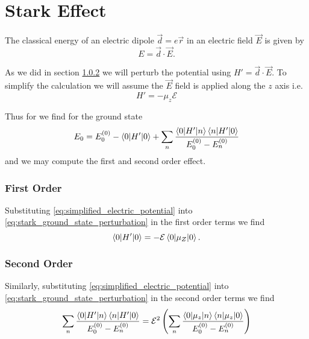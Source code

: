 \section{Stark Effect}
The classical energy of an electric dipole $\vec{d} = e\vec{r}$ in an electric field $\vec{E}$ is given by \cite{Atkins2010-cg}
\begin{equation}
    E = \vec{d} \cdot \vec{E}.
\end{equation}

As we did in section \ref{} we will perturb the potential using $H' = \vec{d} \cdot \vec{E}$. 
To simplify the calculation we will assume the $\vec{E}$ field is applied along the $z$ axis  i.e.
\begin{equation}
    H' = -\mu_z \mathcal{E}
    \label{eq:simplified_electric_potential}
\end{equation}

Thus for we find for the ground state
\begin{equation}
        E_0 = E_0^{(0)} - \braket{0 | H' | 0} + \sum_n \frac{\braket{0 | H' | n }\braket{n | H' | 0}}{E_0^{(0)} - E_n^{(0)}}
    \label{eq:stark_ground_state_perturbation}
\end{equation}
and we may compute the first and second order effect. 

\subsubsection{First Order}
Substituting \ref{eq:simplified_electric_potential} into \ref{eq:stark_ground_state_perturbation} in the first order terms we find 
\begin{equation}
    \braket{0 | H' | 0} = -\mathcal{E} \braket{ 0 | \mu_Z | 0 }. 
    \label{eq:}
\end{equation}

\subsubsection{Second Order}
Similarly, substituting \ref{eq:simplified_electric_potential} into \ref{eq:stark_ground_state_perturbation} in the second order terms we find 
\begin{equation}
    \sum_n \frac{\braket{0 | H' | n }\braket{n | H' | 0}}{E_0^{(0)} - E_n^{(0)}} = \mathcal{E}^2\left(\sum_n \frac{\braket{0 | \mu_z | n }\braket{n | \mu_z | 0}}{E_0^{(0)} - E_n^{(0)}}\right) 
    \label{eq:}
\end{equation}



